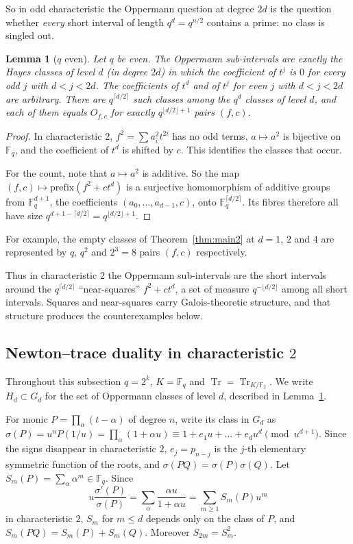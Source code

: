 \documentclass[11pt,a4paper]{amsart}
\newtheorem{lemma}[theorem]{Lemma}
\theoremstyle{definition}
\theoremstyle{remark}
\newcommand{\F}{\mathbb{F}}
\newcommand{\Tr}{\operatorname{Tr}}
\begin{document}
So in odd characteristic the Oppermann question at degree $2d$ is the question whether \emph{every} short interval of
length $q^d=q^{n/2}$ contains a prime: no class is singled out.

\begin{lemma}[$q$ even]\label{lem:even}
Let $q$ be even. The Oppermann sub-intervals are exactly the Hayes classes of level $d$ (in degree $2d$) in which the
coefficient of $t^j$ is $0$ for every odd $j$ with $d<j<2d$. The coefficients of $t^d$ and of $t^j$ for even $j$ with
$d<j<2d$ are arbitrary. There are $q^{\lceil d/2\rceil}$ such classes among the $q^d$ classes of level $d$, and each
of them equals $O_{f,c}$ for exactly $q^{\lfloor d/2\rfloor+1}$ pairs $(f,c)$.
\end{lemma}

\begin{proof}
In characteristic $2$, $f^2=\sum a_i^2t^{2i}$ has no odd terms, $a\mapsto a^2$ is bijective on $\F_q$, and the
coefficient of $t^d$ is shifted by $c$. This identifies the classes that occur.

For the count, note that $a\mapsto a^2$ is additive. So the map $(f,c)\mapsto\mathrm{prefix}(f^2+ct^d)$ is a
surjective homomorphism of additive groups from $\F_q^{d+1}$, the coefficients $(a_0,\dots,a_{d-1},c)$, onto
$\F_q^{\lceil d/2\rceil}$. Its fibres therefore all have size $q^{d+1-\lceil d/2\rceil}=q^{\lfloor d/2\rfloor+1}$.
\end{proof}

For example, the empty classes of Theorem~\ref{thm:main2} at $d=1$, $2$ and $4$ are represented by $q$, $q^2$ and
$2^3=8$ pairs $(f,c)$ respectively.

Thus in characteristic $2$ the Oppermann sub-intervals are the short intervals around the $q^{\lceil d/2\rceil}$
``near-squares'' $f^2+ct^d$, a set of measure $q^{-\lfloor d/2\rfloor}$ among all short intervals. Squares and
near-squares carry Galois-theoretic structure, and that structure produces the counterexamples below.

\subsection{Newton--trace duality in characteristic \texorpdfstring{$2$}{2}}\label{subsec:newton}
Throughout this subsection $q=2^k$, $K=\F_q$ and $\Tr=\Tr_{K/\F_2}$. We write $H_d\subset G_d$ for the set of
Oppermann classes of level $d$, described in Lemma~\ref{lem:even}.

For monic $P=\prod_\alpha(t-\alpha)$ of degree $n$, write its class in $G_d$ as
$\sigma(P)=u^nP(1/u)=\prod_\alpha(1+\alpha u)\equiv1+e_1u+\dots+e_du^d\pmod{u^{d+1}}$. Since the signs disappear in
characteristic $2$, $e_j=p_{n-j}$ is the $j$-th elementary symmetric function of the roots, and
$\sigma(PQ)=\sigma(P)\sigma(Q)$. Let
$S_m(P)=\sum_\alpha\alpha^m\in\F_q$. Since
\[
u\frac{\sigma'(P)}{\sigma(P)}=\sum_\alpha\frac{\alpha u}{1+\alpha u}=\sum_{m\ge1}S_m(P)u^m
\]
in characteristic $2$, $S_m$ for $m\le d$ depends only on the class of $P$, and $S_m(PQ)=S_m(P)+S_m(Q)$. Moreover
$S_{2m}=S_m^2$.
\end{document}
